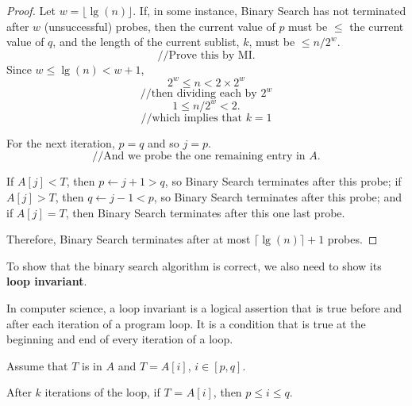                 \begin{proof}
                Let \( w = \lfloor \lg(n) \rfloor \). If, in some instance, Binary Search has not terminated after \( w \) (unsuccessful) probes, then the current value of \( p \) must be \( \leq \) the current value of \( q \), and the length of the current sublist, \( k \), must be \( \leq n/2^w \).
                \[ // \text{Prove this by MI.} \]
                Since \( w \leq \lg(n) < w + 1 \),
                \[ 2^w \leq n < 2 \times 2^w \]
                \[ // \text{then dividing each by } 2^w \]
                \[ 1 \leq n/2^w < 2. \]
                \[ // \text{which implies that } k = 1 \]
                
                For the next iteration, \( p = q \) and so \( j = p \).
                \[ // \text{And we probe the one remaining entry in } A. \]
                
                If \( A[j] < T \), then \( p \leftarrow j + 1 > q \), so Binary Search terminates after this probe; if \( A[j] > T \), then \( q \leftarrow j - 1 < p \), so Binary Search terminates after this probe; and if \( A[j] = T \), then Binary Search terminates after this one last probe.
                
                Therefore, Binary Search terminates after at most \(\lceil \lg(n) \rceil + 1\) probes.
                \end{proof}
    To show that the binary search algorithm is correct, we also need to show its \textbf{loop invariant}.
        \begin{definition}
            In computer science, a loop invariant is a logical assertion that is true before and after 
            each iteration of a program loop. It is a condition that is true at the beginning and 
            end of every iteration of a loop.
        \end{definition}
    Assume that $T$ is in $A$ and $T=A[i]$, $i \in [p, q]$.
    \begin{theorem}
        After $k$ iterations of the loop, if $T$ = $A[i]$, then $p\leq i \leq q$.
    \end{theorem}
